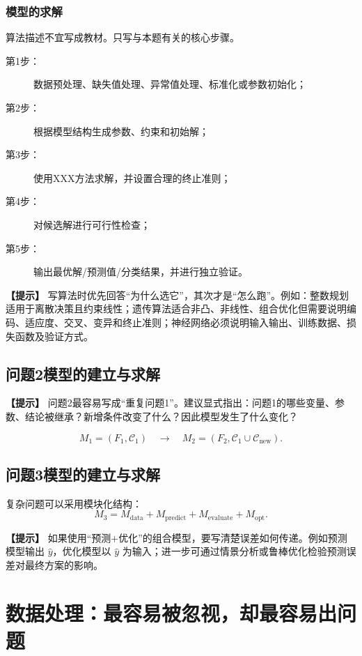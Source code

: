 \documentclass[12pt,a4paper]{article}
\newcommand{\tip}[1]{\par\noindent\textbf{【提示】} #1\par}
\begin{document}
\subsubsection{模型的求解}

算法描述不宜写成教材。只写与本题有关的核心步骤。

\begin{description}
\item[第1步：] 数据预处理、缺失值处理、异常值处理、标准化或参数初始化；
\item[第2步：] 根据模型结构生成参数、约束和初始解；
\item[第3步：] 使用XXX方法求解，并设置合理的终止准则；
\item[第4步：] 对候选解进行可行性检查；
\item[第5步：] 输出最优解/预测值/分类结果，并进行独立验证。
\end{description}

\tip{写算法时优先回答“为什么选它”，其次才是“怎么跑”。例如：整数规划适用于离散决策且约束线性；遗传算法适合非凸、非线性、组合优化但需要说明编码、适应度、交叉、变异和终止准则；神经网络必须说明输入输出、训练数据、损失函数及验证方式。}

\subsection{问题2模型的建立与求解}

\tip{问题2最容易写成“重复问题1”。建议显式指出：问题1的哪些变量、参数、结论被继承？新增条件改变了什么？因此模型发生了什么变化？}

\[
M_1=(F_1,\mathcal C_1)\quad\longrightarrow\quad
M_2=(F_2,\mathcal C_1\cup\mathcal C_{\mathrm{new}}).
\]

\subsection{问题3模型的建立与求解}

复杂问题可以采用模块化结构：
\[
M_3=M_{\mathrm{data}}+M_{\mathrm{predict}}+M_{\mathrm{evaluate}}+M_{\mathrm{opt}}.
\]

\tip{如果使用“预测+优化”的组合模型，要写清楚误差如何传递。例如预测模型输出 $\hat y$，优化模型以 $\hat y$ 为输入；进一步可通过情景分析或鲁棒优化检验预测误差对最终方案的影响。}

\section{数据处理：最容易被忽视，却最容易出问题}
\end{document}
